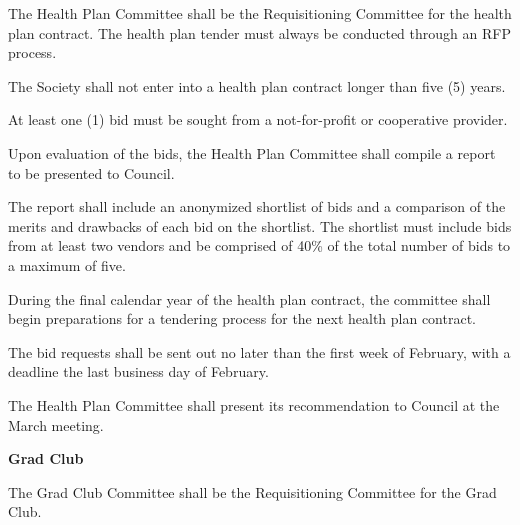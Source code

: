 \begin{longenum}[label*=\thesection.\arabic*., align=left]
\begin{longenum} [label*=\arabic*., align=left]
		\begin{longenum} [label*=\arabic*., align=left]
			\item The Health Plan Committee shall be the Requisitioning Committee for the health plan contract. The health plan tender must always be conducted through an RFP process.
		\item 	The Society shall not enter into a health plan contract longer than five (5) years.
		\item 	At least one (1) bid must be sought from a not-for-profit or cooperative provider.
		\item Upon evaluation of the bids, the Health Plan Committee shall compile a report to be presented to Council.
		\item The  report  shall  include  an  anonymized  shortlist  of  bids  and  a  comparison  of  the  merits  and  drawbacks  of  each  bid  on  the  shortlist.  The  shortlist  must  include  bids  from  at  least  two  vendors  and  be  comprised  of  40\%  of  the  total  number  of  bids  to  a  maximum  of  five.
		\item During the final calendar year of the health plan contract, the committee shall begin preparations for a tendering process for the next health plan contract.
		\item 	The bid requests shall be sent out no later than the first week of February, with a deadline the last business day of February.
		\item 	The Health Plan Committee shall present its recommendation to Council at the
March meeting.
	\end{longenum}	
	
\item \textbf{Grad Club}

\begin{longenum} [label*=\arabic*., align=left]
	\item The Grad Club Committee shall be the Requisitioning Committee for the Grad Club.
\end{longenum}	


\end{longenum}

\end{longenum}
